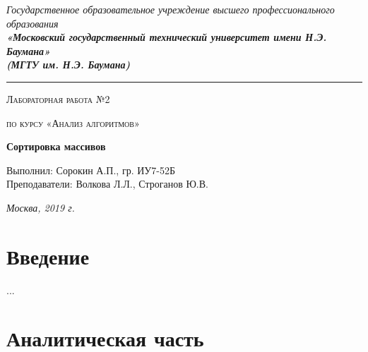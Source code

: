 \documentclass[12pt, a4paper]{report}
\begin{document}
    \begin{titlepage}

        \begin{center}
            \Large
            {\sl Государственное образовательное учреждение высшего профессионального образования\\
            {\bf«Московский государственный технический университет имени Н.Э. Баумана»\\
				(МГТУ им. Н.Э. Баумана)}}
				\noindent\rule{\textwidth}{2pt}
            \vspace{3cm}

			{\scshape\LARGE Лабораторная работа №2 \par}
			\vspace{0.5cm}	
			{\scshape\LARGE по курсу «Анализ алгоритмов» \par}
			\vspace{1.5cm}
			{\huge\bfseries Сортировка массивов \par}
			\vspace{2cm}
			\Large Выполнил: Сорокин А.П., гр. ИУ7-52Б\\
			\vspace{0.5cm}
			{\Large Преподаватели: Волкова Л.Л., Строганов Ю.В.}
		
			\vfill
			\Large \textit {Москва, 2019 г.}
            
        \end{center}

    \end{titlepage}
	
	\tableofcontents

	\chapter*{Введение}
	
	...

    \chapter{Аналитическая часть}
\end{document}
